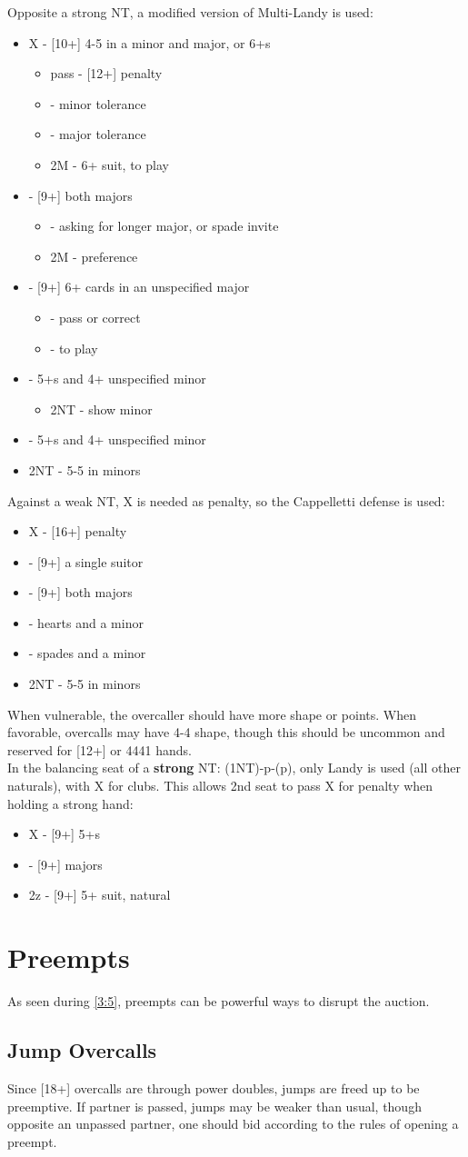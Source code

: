 \documentclass[12pt]{report}
\newcommand{\n}{\\}
\newcommand{\q}[1]{\multido{}{#1}{\qquad}}
\newcommand{\ul}[1]{\begin{itemize}#1\end{itemize}}
\newcommand{\li}[1]{\item[~] \q{#1}}
\begin{document}
    Opposite a strong NT, a modified version of Multi-Landy is used:
    \ul{
        \li0 X - [10+] 4-5 in a minor and major, or 6+\di{}s \ul{
            \li0 pass - [12+] penalty
            \li0 \cl2 - minor tolerance
            \li0 \di2 - major tolerance
            \li0 2M - 6+ suit, to play
        }

        \li0 \cl2 - [9+] both majors \ul{
            \li0 \di2 - asking for longer major, or spade invite
            \li0 2M - preference
        }

        \li0 \di2 - [9+] 6+ cards in an unspecified major \ul{
            \li1 \he2 - pass or correct
            \li1 \sp2 - to play
        }

        \li0 \he2 - 5+\he{}s and 4+ unspecified minor \ul{
            \li1 2NT - show minor
        }

        \li0 \sp2 - 5+\sp{}s and 4+ unspecified minor
        \li0 2NT - 5-5 in minors
    }

    Against a weak NT, X is needed as penalty, so the Cappelletti defense is used:
    \ul{
        \li0 X - [16+] penalty
        \li0  - [9+] a single suitor
        \li0 \di2 - [9+] both majors
        \li0 \he2 - hearts and a minor
        \li0 \sp2 - spades and a minor
        \li0 2NT - 5-5 in minors
    }

    When vulnerable, the overcaller should have more shape or points.  When favorable, overcalls may have 4-4 shape, though this should be uncommon and reserved for [12+] or 4441 hands. \n

    In the balancing seat of a \textbf{strong} NT: (1NT)-p-(p), only Landy is used (all other naturals), with X for clubs.  This allows 2nd seat to pass X for penalty when holding a strong hand:
    \ul{
        \li0 X - [9+] 5+\cl{}s
        \li0  - [9+] majors
        \li0 2z - [9+] 5+ suit, natural
    }

\section{Preempts} \label{4:5}

    As seen during \ref{3:5}, preempts can be powerful ways to disrupt the auction.

\subsection{Jump Overcalls}
    
    Since [18+] overcalls are through power doubles, jumps are freed up to be preemptive.  If partner is passed, jumps may be weaker than usual, though opposite an unpassed partner, one should bid according to the rules of opening a preempt. \n
\end{document}
